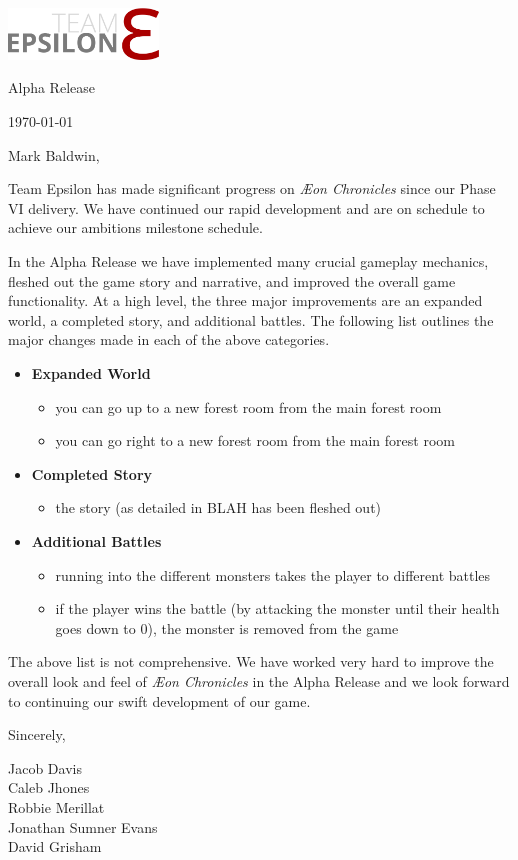 \documentclass[12pt]{article}
\newcommand\aeon{\textit{\AE on Chronicles}\xspace}
\newcommand\tab[1][.5in]{\hspace*{#1}}
\newcommand\releasename{Alpha Release\xspace}
\newcommand\te{Team Epsilon\xspace}
\begin{document}
\hfill\includegraphics[width=4cm]{../graphics/logo/team-epsilon-light-cropped}

\hfill \releasename

\hfill \today

Mark Baldwin,

\te has made significant progress on \aeon since our Phase VI delivery. We have
continued our rapid development and are on schedule to achieve our ambitions
milestone schedule.

In the \releasename we have implemented many crucial gameplay mechanics, fleshed
out the game story and narrative, and improved the overall game functionality.
At a high level, the three major improvements are an expanded world, a completed
story, and additional battles. The following list outlines the major changes
made in each of the above categories.

\begin{itemize}
    \item \textbf{Expanded World}
        \begin{itemize}
            \item you can go up to a new forest room from the main forest room
            \item you can go right to a new forest room from the main forest
                room
        \end{itemize}

    \item \textbf{Completed Story}
        \begin{itemize}
            \item the story (as detailed in BLAH has been fleshed out) %
        \end{itemize}

    \item \textbf{Additional Battles}
        \begin{itemize}
            \item running into the different monsters takes the player to
                different battles
            \item if the player wins the battle (by attacking the monster until
                their health goes down to 0), the monster is removed from the
                game
        \end{itemize}
\end{itemize}

The above list is not comprehensive. We have worked very hard to improve the
overall look and feel of \aeon in the \releasename and we look forward to
continuing our swift development of our game.

Sincerely,

\tab Jacob Davis \\
\tab Caleb Jhones \\
\tab Robbie Merillat \\
\tab Jonathan Sumner Evans \\
\tab David Grisham \\
\end{document}
